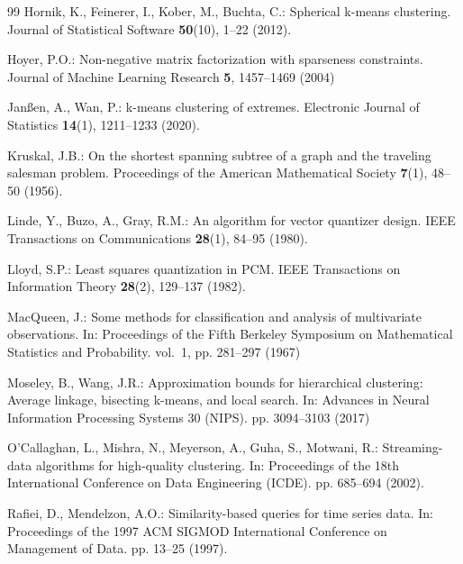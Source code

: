 \documentclass[11pt]{article}
\theoremstyle{remark}\newtheorem{remark}{Remark}\renewcommand{\theremark}{S\arabic{remark}}
\begin{document}
\begin{thebibliography}{99}
Hornik, K., Feinerer, I., Kober, M., Buchta, C.: Spherical k-means clustering.
  Journal of Statistical Software  \textbf{50}(10),  1--22 (2012).

Hoyer, P.O.: Non-negative matrix factorization with sparseness constraints.
  Journal of Machine Learning Research  \textbf{5},  1457--1469 (2004)

Jan{\ss}en, A., Wan, P.: k-means clustering of extremes. Electronic Journal of
  Statistics  \textbf{14}(1),  1211--1233 (2020). 

Kruskal, J.B.: On the shortest spanning subtree of a graph and the traveling
  salesman problem. Proceedings of the American Mathematical Society
  \textbf{7}(1),  48--50 (1956). 

Linde, Y., Buzo, A., Gray, R.M.: An algorithm for vector quantizer design. IEEE
  Transactions on Communications  \textbf{28}(1),  84--95 (1980).

Lloyd, S.P.: Least squares quantization in {PCM}. IEEE Transactions on
  Information Theory  \textbf{28}(2),  129--137 (1982).

MacQueen, J.: Some methods for classification and analysis of multivariate
  observations. In: Proceedings of the Fifth Berkeley Symposium on Mathematical
  Statistics and Probability. vol.~1, pp. 281--297 (1967)

Moseley, B., Wang, J.R.: Approximation bounds for hierarchical clustering:
  Average linkage, bisecting k-means, and local search. In: Advances in Neural
  Information Processing Systems 30 (NIPS). pp. 3094--3103 (2017)

O'Callaghan, L., Mishra, N., Meyerson, A., Guha, S., Motwani, R.:
  Streaming-data algorithms for high-quality clustering. In: Proceedings of the
  18th International Conference on Data Engineering (ICDE). pp. 685--694
  (2002). 

Rafiei, D., Mendelzon, A.O.: Similarity-based queries for time series data. In:
  Proceedings of the 1997 ACM SIGMOD International Conference on Management of
  Data. pp. 13--25 (1997). 


\end{thebibliography}
\end{document}
